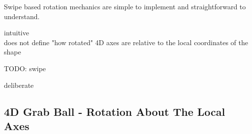 \documentclass{l4proj}
\begin{document}
%

Swipe based rotation mechanics are simple to implement and straightforward to understand.

intuitive\\
does not define "how rotated" 4D axes are relative to the local coordinates of the shape

TODO: swipe

deliberate

\subsection{4D Grab Ball - Rotation About The Local Axes}
\end{document}
